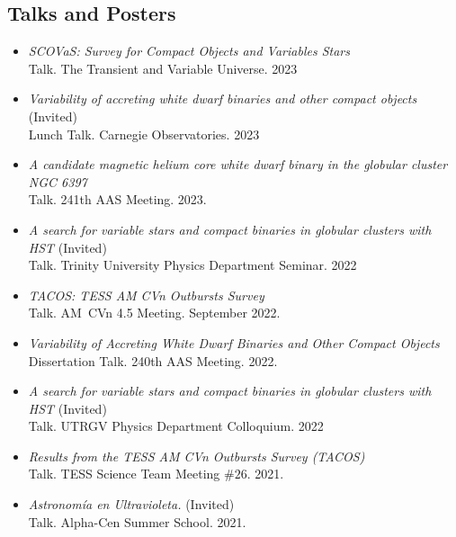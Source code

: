 \documentclass[letterpaper,10pt]{article}
\begin{document}
\subsection*{Talks and Posters}

\begin{itemize}[label=$\blacktriangleright$]

\item \textit{ SCOVaS: Survey for Compact Objects and Variables Stars}  \\ Talk. The Transient and Variable Universe. 2023


\item \textit{ Variability of accreting white dwarf binaries and other compact objects }  (Invited) \\ Lunch Talk. Carnegie Observatories. 2023

\item \textit{A candidate magnetic helium core white dwarf binary in the globular cluster NGC 6397} \\ Talk. 241th AAS Meeting. 2023.

\item \emph{A search for variable stars and compact binaries in globular clusters with HST} (Invited)\\
Talk. Trinity University Physics Department Seminar. 2022

\item \textit{TACOS: TESS AM CVn Outbursts Survey} \\ Talk. AM~CVn 4.5 Meeting. September 2022.

\item \textit{Variability of Accreting White Dwarf Binaries and Other Compact Objects} \\ Dissertation Talk. 240th AAS Meeting. 2022.


\item \emph{A search for variable stars and compact binaries in globular clusters with HST} (Invited)\\
Talk. UTRGV Physics Department Colloquium. 2022


\item \textit{Results from the TESS AM CVn Outbursts Survey (TACOS)} \\ Talk. TESS Science Team Meeting $\#26$. 2021.


\item \textit{Astronom\'ia en Ultravioleta.} (Invited)\\ Talk. Alpha-Cen Summer School. 2021.


\end{itemize}
\end{document}

